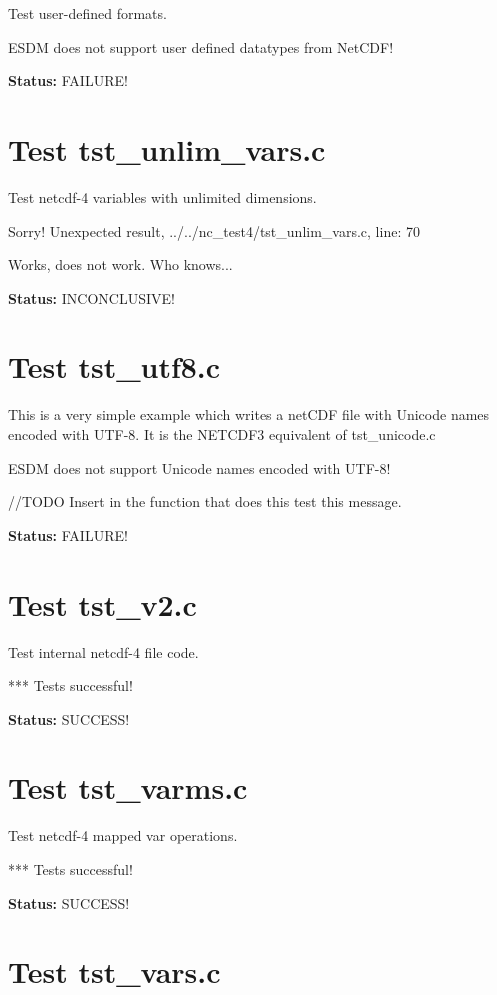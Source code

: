 Test user-defined formats.

ESDM does not support user defined datatypes from NetCDF!

{\bf \large Status: } FAILURE!

\section{Test tst\_unlim\_vars.c}

Test netcdf-4 variables with unlimited dimensions.

Sorry! Unexpected result, ../../nc\_test4/tst\_unlim\_vars.c, line: 70

Works, does not work. Who knows...

{\bf \large Status: } INCONCLUSIVE!

\section{Test tst\_utf8.c}

This is a very simple example which writes a netCDF file with Unicode names encoded with UTF-8. It is the NETCDF3 equivalent of tst\_unicode.c

ESDM does not support Unicode names encoded with UTF-8!

//TODO Insert in the function that does this test this message.

{\bf \large Status: } FAILURE!

\section{Test tst\_v2.c}

Test internal netcdf-4 file code.

*** Tests successful!

{\bf \large Status: } SUCCESS!

\section{Test tst\_varms.c}

Test netcdf-4 mapped var operations.

*** Tests successful!

{\bf \large Status: } SUCCESS!

\section{Test tst\_vars.c}

